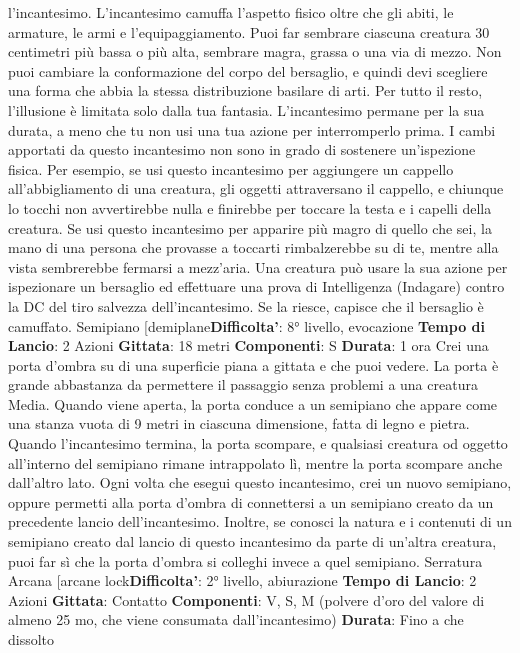 \begin{multicols}{2}
l’incantesimo.
L’incantesimo camuffa l’aspetto fisico oltre che gli abiti,
le armature, le armi e l’equipaggiamento. Puoi far
sembrare ciascuna creatura 30 centimetri più bassa o
più alta, sembrare magra, grassa o una via di mezzo.
Non puoi cambiare la conformazione del corpo del
bersaglio, e quindi devi scegliere una forma che abbia
la stessa distribuzione basilare di arti. Per tutto il resto,
l’illusione è limitata solo dalla tua fantasia.
L’incantesimo permane per la sua durata, a meno che
tu non usi una tua azione per interromperlo prima.
I cambi apportati da questo incantesimo non sono in
grado di sostenere un’ispezione fisica. Per esempio, se
usi questo incantesimo per aggiungere un cappello
all’abbigliamento di una creatura, gli oggetti
attraversano il cappello, e chiunque lo tocchi non
avvertirebbe nulla e finirebbe per toccare la testa e i
capelli della creatura. Se usi questo incantesimo per
apparire più magro di quello che sei, la mano di una
persona che provasse a toccarti rimbalzerebbe su di te,
mentre alla vista sembrerebbe fermarsi a mezz’aria.
Una creatura può usare la sua azione per ispezionare
un bersaglio ed effettuare una prova di Intelligenza
(Indagare) contro la DC del tiro salvezza 
dell’incantesimo. Se la riesce, capisce che il bersaglio è
camuffato.
Semipiano
[demiplane\textbf{Difficolta'}:
8° livello, evocazione
\textbf{Tempo di Lancio}: 2 Azioni
\textbf{Gittata}: 18 metri
\textbf{Componenti}: S
\textbf{Durata}: 1 ora
Crei una porta d’ombra su di una superficie piana a
gittata e che puoi vedere. La porta è grande
abbastanza da permettere il passaggio senza problemi
a una creatura Media. Quando viene aperta, la porta
conduce a un semipiano che appare come una stanza
vuota di 9 metri in ciascuna dimensione, fatta di legno e
pietra. Quando l’incantesimo termina, la porta
scompare, e qualsiasi creatura od oggetto all’interno del
semipiano rimane intrappolato lì, mentre la porta
scompare anche dall’altro lato.
Ogni volta che esegui questo incantesimo, crei un
nuovo semipiano, oppure permetti alla porta d’ombra di
connettersi a un semipiano creato da un precedente
lancio dell’incantesimo. Inoltre, se conosci la natura e i
contenuti di un semipiano creato dal lancio di questo
incantesimo da parte di un’altra creatura, puoi far sì che
la porta d’ombra si colleghi invece a quel semipiano.
Serratura Arcana
[arcane lock\textbf{Difficolta'}:
2° livello, abiurazione
\textbf{Tempo di Lancio}: 2 Azioni
\textbf{Gittata}: Contatto
\textbf{Componenti}: V, S, M (polvere d’oro del valore di
almeno 25 mo, che viene consumata dall’incantesimo)
\textbf{Durata}: Fino a che dissolto

\end{multicols}
